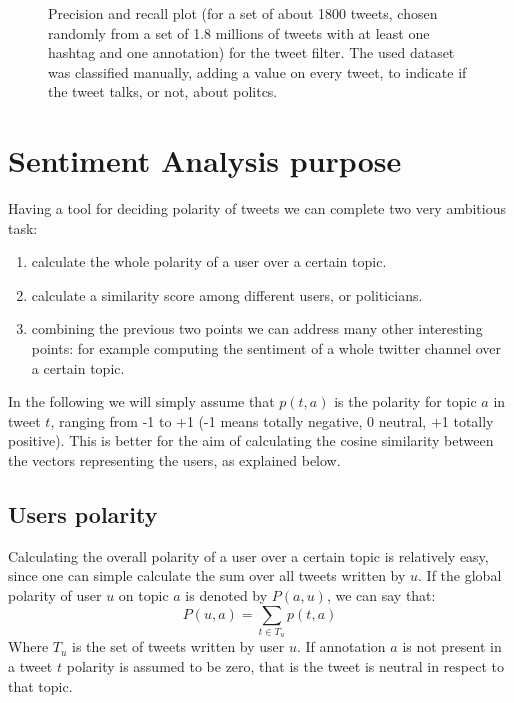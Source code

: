 \documentclass[a4paper,11pt,oneside]{article}
\begin{document}
\begin{figure}
\centering
{}
\caption{Precision and recall plot (for a set of about 1800 tweets, chosen randomly from a set of 1.8 millions of tweets with at least one hashtag and one annotation) for the tweet filter.
The used dataset was classified manually, adding a value on every tweet, to indicate if the tweet talks, or not, about politcs.}
\label{fig:filterPrecision}
\end{figure}


\section{Sentiment Analysis purpose}
\label{sec:exitpoll}
Having a tool for deciding polarity of tweets we can complete two very ambitious task: 
\begin{enumerate}
\item calculate the whole polarity of a user over a certain topic.
\item calculate a similarity score among different users, or politicians.
\item combining the previous two points we can address many other interesting points: for example computing the sentiment of a whole twitter channel over a certain topic.
\end{enumerate}
In the following we will simply assume that $p(t,a)$ is the polarity for topic $a$ in tweet $t$, ranging from -1 to +1 (-1 means totally negative, 0 neutral, +1 totally positive). This is better for the aim of calculating the cosine similarity between the vectors representing the users, as explained below.

\subsection{Users polarity}
Calculating the overall polarity of a user over a certain topic is relatively easy, since one can simple calculate the sum over all tweets written by $u$. If the global polarity of user $u$ on topic $a$ is denoted by $P(a,u)$, we can say that: %
\begin{equation}
P(u,a) = \sum_{t \in T_u} p(t,a) %
\end{equation}
Where $T_u$ is the set of tweets written by user $u$. If annotation $a$ is not present in a tweet $t$ polarity is assumed to be zero, that is the tweet is neutral in respect to that topic.
\end{document}
